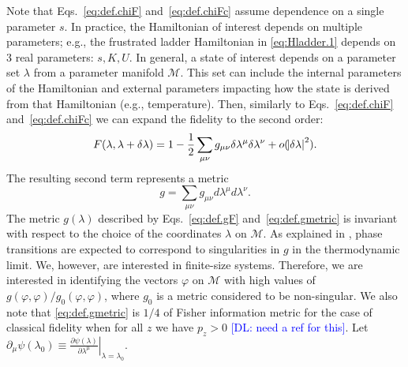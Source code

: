 \documentclass[american,aps,pra,reprint,floatfix,nofootinbib,superscriptaddress]{revtex4-2}
\newcommand{\DL}[1]{\textcolor{blue}{[DL: #1]}}
\begin{document}
Note that Eqs.~\eqref{eq:def.chiF} and~\eqref{eq:def.chiFc} assume dependence
on a single parameter $s$. In practice, the Hamiltonian of interest depends
on multiple parameters; e.g., the frustrated ladder Hamiltonian in
\cref{eq:Hladder.1} depends on 3 real parameters: $s, K, U$. In general,
a state of interest depends on a parameter set $\lambda$ from
a parameter manifold $\mathcal{M}$. 
This set can include the internal parameters of the Hamiltonian and external parameters impacting
how the state is derived from that Hamiltonian (e.g., temperature).
Then, similarly to Eqs.~\eqref{eq:def.chiF} and~\eqref{eq:def.chiFc} we can expand the fidelity to the second order:
\begin{equation}
\label{eq:def.gF}
  F(\lambda, \lambda + \delta \lambda) =
  1 - \frac12 \sum_{\mu\nu} g_{\mu\nu} \delta \lambda^\mu \delta \lambda^\nu
  + o(\abs{\delta \lambda}^2).
\end{equation}
The resulting second term represents a metric
\begin{equation}
  \label{eq:def.gmetric}
  g = \sum_{\mu\nu} g_{\mu\nu} d\lambda^\mu d\lambda^\nu.
\end{equation}
The metric $g(\lambda)$ described by Eqs.~\eqref{eq:def.gF} and~\eqref{eq:def.gmetric}
is invariant with
respect to the choice of the coordinates $\lambda$ on $\mathcal{M}$.
As explained in \cite{zanardi2007information}, phase transitions are expected
to correspond to singularities in 
$g$ in the
thermodynamic limit. We, however, are interested in 
finite-size systems.
Therefore, we are interested in identifying the vectors
$\varphi$ on $\mathcal{M}$ with high values of
$g(\varphi, \varphi) / g_0(\varphi, \varphi)$,
where $g_0$ is a metric considered to be non-singular.
We also note that \cref{eq:def.gmetric} is $1/4$ of Fisher information metric
for the case of classical fidelity when for all $z$ we have $p_z > 0$ \DL{need a ref for this}.
Let $\partial_\mu \psi(\lambda_0)\equiv \left.\frac{\partial \psi(\lambda)}{\partial \lambda^\mu} \right|_{\lambda=\lambda_0}$.
\end{document}
